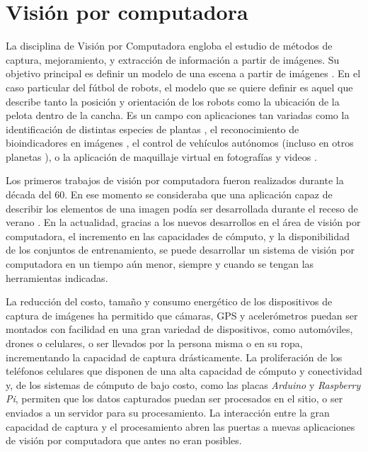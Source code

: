 
\section{Visión por computadora}

La disciplina de Visión por Computadora engloba el estudio de métodos de
captura, mejoramiento, y extracción de información a partir de imágenes. Su
objetivo principal es definir un modelo de una escena a partir de imágenes
\cite{cvLinda2001}. En el caso particular del fútbol de robots, el modelo que se
quiere definir es aquel que describe tanto la posición y orientación de los
robots como la ubicación de la pelota dentro de la cancha. Es un campo con
aplicaciones tan variadas como la identificación de distintas especies de
plantas \cite{plantIdentificacionUCVT2018}, el reconocimiento de bioindicadores
en imágenes \cite{anurosEmImagm2016}, el control de vehículos autónomos
\cite{e2eLearning4SDC} (incluso en otros planetas
\cite{twoYearsMarsRovers2007}), o la aplicación de maquillaje virtual en
fotografías y videos \cite{virtualMakeup2015}.

Los primeros trabajos de visión por computadora fueron realizados durante la
década del 60. En ese momento se consideraba que una aplicación capaz de
describir los elementos de una imagen podía ser desarrollada durante el receso
de verano \cite{summerVisionProject1966}. En la actualidad, gracias a los nuevos
desarrollos en el área de visión por computadora, el incremento en las
capacidades de cómputo, y la disponibilidad de los conjuntos de entrenamiento,
se puede desarrollar un sistema de visión por computadora en un tiempo aún
menor, siempre y cuando se tengan las herramientas indicadas.

La reducción del costo, tamaño y consumo energético de los dispositivos de
captura de imágenes ha permitido que cámaras, GPS y acelerómetros puedan ser
montados con facilidad en una gran variedad de dispositivos, como automóviles,
drones o celulares, o ser llevados por la persona misma o en su ropa,
incrementando la capacidad de captura drásticamente. La proliferación de los
teléfonos celulares que disponen de una alta capacidad de cómputo y conectividad
y, de los sistemas de cómputo de bajo costo, como las placas \emph{Arduino} y
\emph{Raspberry Pi}, permiten que los datos capturados puedan ser procesados en
el sitio, o ser enviados a un servidor para su procesamiento. La interacción
entre la gran capacidad de captura y el procesamiento abren las puertas a nuevas
aplicaciones de visión por computadora que antes no eran posibles.

